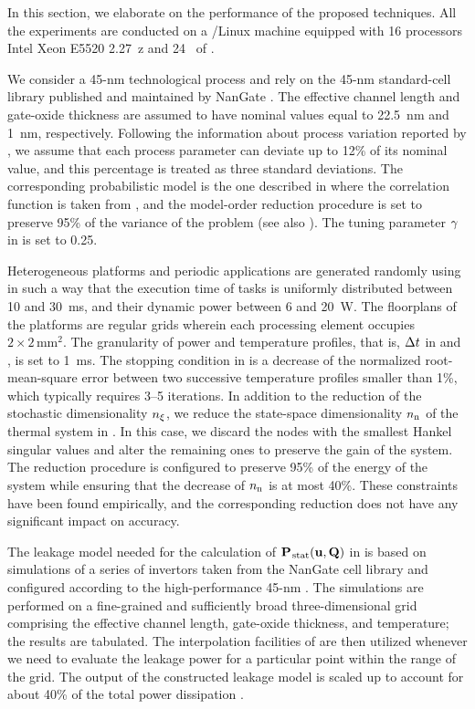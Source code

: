 In this section, we elaborate on the performance of the proposed techniques.
All the experiments are conducted on a /Linux machine equipped with 16 processors Intel Xeon E5520 2.27~z and 24~ of .

We consider a 45-nm technological process and rely on the 45-nm standard-cell library published and maintained by NanGate \cite{nangate}.
The effective channel length and gate-oxide thickness are assumed to have nominal values equal to 22.5~nm and 1~nm, respectively.
Following the information about process variation reported by  \cite{itrs}, we assume that each process parameter can deviate up to 12\% of its nominal value, and this percentage is treated as three standard deviations.
The corresponding probabilistic model is the one described in  where the correlation function is taken from \cite{ukhov2014}, and the model-order reduction procedure is set to preserve 95\% of the variance of the problem (see also ).
The tuning parameter $\gamma$ in  is set to 0.25.

Heterogeneous platforms and periodic applications are generated randomly using  \cite{dick1998} in such a way that the execution time of tasks is uniformly distributed between 10 and 30~ms, and their dynamic power between 6 and 20~W.
The floorplans of the platforms are regular grids wherein each processing element occupies $2 \times 2\,\text{mm}^2$.
The granularity of power and temperature profiles, that is, $\Delta t$ in  and , is set to 1~ms.
The stopping condition in  is a decrease of the normalized root-mean-square error between two successive temperature profiles smaller than 1\%, which typically requires 3--5 iterations.
In addition to the reduction of the stochastic dimensionality ${n_\xi}$, we reduce the state-space dimensionality ${n_\text{n}}$ of the thermal system in .
In this case, we discard the nodes with the smallest Hankel singular values and alter the remaining ones to preserve the  gain of the system.
The reduction procedure is configured to preserve 95\% of the energy of the system while ensuring that the decrease of ${n_\text{n}}$ is at most 40\%.
These constraints have been found empirically, and the corresponding reduction does not have any significant impact on accuracy.

The leakage model needed for the calculation of $\mathbf{P}_{\text{\kern0.1emstat}}(\mathbf{u}, \mathbf{Q})$ in  is based on  simulations of a series of  invertors taken from the NanGate cell library and configured according to the high-performance 45-nm  \cite{ptm}.
The simulations are performed on a fine-grained and sufficiently broad three-dimensional grid comprising the effective channel length, gate-oxide thickness, and temperature; the results are tabulated.
The interpolation facilities of  \cite{matlab} are then utilized whenever we need to evaluate the leakage power for a particular point within the range of the grid.
The output of the constructed leakage model is scaled up to account for about 40\% of the total power dissipation \cite{liu2007}.

